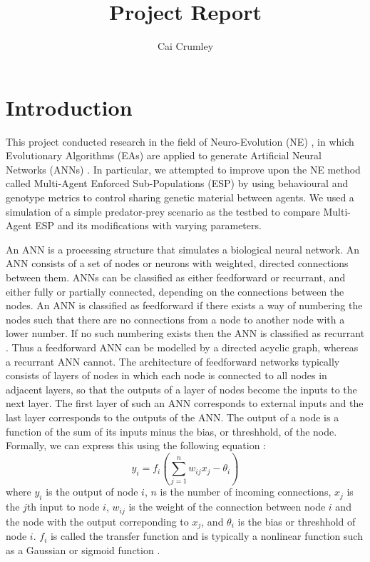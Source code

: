 \documentclass[12pt]{article} %
\title{Project Report}
\author{Cai Crumley}
\begin{document}
\maketitle

\section{Introduction}

This project conducted research in the field of Neuro-Evolution (NE) \cite{Montana1989}, in which Evolutionary Algorithms (EAs) \cite{Back1993} are applied to generate Artificial Neural Networks (ANNs) \cite{Yegnanarayana2004}. In particular, we attempted to improve upon the NE method called Multi-Agent Enforced Sub-Populations (ESP) \cite{Moriarty1997}\cite{Yong2001} by using behavioural and genotype metrics to control sharing genetic material between agents. We used a simulation of a simple predator-prey scenario \cite{Gomez1997} as the testbed to compare Multi-Agent ESP and its modifications with varying parameters.

An ANN is a processing structure that simulates a biological neural network. An ANN consists of a set of nodes or neurons with weighted, directed connections between them. ANNs can be classified as either feedforward or recurrant, and either fully or partially connected, depending on the connections between the nodes. An ANN is classified as feedforward if there exists a way of numbering the nodes such that there are no connections from a node to another node with a lower number. If no such numbering exists then the ANN is classified as recurrant \cite{Yao1999}. Thus a feedforward ANN can be modelled by a directed acyclic graph, whereas a recurrant ANN cannot.
The architecture of feedforward networks typically consists of layers of nodes in which each node is connected to all nodes in adjacent layers, so that the outputs of a layer of nodes become the inputs to the next layer. The first layer of such an ANN corresponds to external inputs and the last layer corresponds to the outputs of the ANN. The output of a node is a function of the sum of its inputs minus the bias, or threshhold, of the node. Formally, we can express this using the following equation \cite{Yao1999}:
\[
y_i = f_i \left(\sum_{j = 1} ^n w_{ij}x_j - \theta_i \right)
\]
where $y_i$ is the output of node $i$, $n$ is the number of incoming connections, $x_j$ is the $j$th input to node $i$, $w_{ij}$ is the weight of the connection between node $i$ and the node with the output correponding to $x_j$, and $\theta_i$ is the bias or threshhold of node $i$. $f_i$ is called the transfer function and is typically a nonlinear function such as a Gaussian or sigmoid function \cite{Yao1999}.
\end{document}
